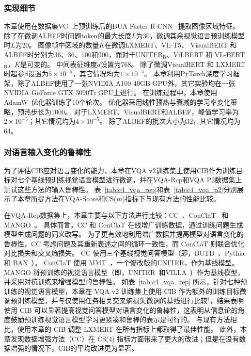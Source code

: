 \subsubsection{实现细节}
本章使用在数据集VG~\cite{krishna2017visual}上预训练后的BUA Faster R-CNN~\cite{anderson2018bottom} 提取图像区域特征。
除了在微调ALBEF时问题token的最大长度$L$为30，微调其余视觉语言预训练模型时$L$为20。
图像帧中区域的数量$K$在微调LXMERT、VL-T5、 VisualBERT 和 ALBEF时分别为36、36、100和900，而对于UNITER$_{\text{B}}$、ViLBERT 和 VL-BERT$_{\text{B}}$，$K$是可变的。
中间表征维度$d$设置为768。
除了微调VisualBERT 和 LXMERT时超参$\beta$设置为$5\times10^{-5}$，其它情况均为$1\times10^{-4}$。
本章利用PyTorch深度学习框架，除了ALBEF使用了一张NVIDIA A100 40GB GPU外，其它实验均在一张NVIDIA GeForce GTX 3090Ti GPU上进行。
在训练过程中，本章使用AdamW~\cite{loshchilov2017decoupled}优化器训练了10个轮次。
优化器采用线性预热与衰减的学习率变化策略，预热步长为1000。
对于LXMERT、VisualBERT和ALBEF，峰值学习率为$2\times 10^{-5}$；其它情况均为$4\times 10^{-5}$。
除了ALBEF的批次大小为32，其它情况均为64。







\subsubsection{对语言输入变化的鲁棒性}
为了评估CIB应对语言变化的能力，本章在VQA v2训练集上使用CIB作为训练目标对七个基线预训练视觉语言模型进行微调，并在VQA-Rep和VQA P2数据集上测试这些方法的输入鲁棒性。
表~\ref{tab:c4_vqa_rep}和表~\ref{tab:c4_vqa_p2}分别展示了本章所提方法在VQA-Score和CS($m$)指标下与现有方法的性能比较。

在VQA-Rep数据集上，本章主要与以下方法进行比较：CC~\cite{shah2019cycle}、ConClaT~\cite{kant2021contrast} 和 MANGO~\cite{li2020closer}。
具体而言，CC 和 ConClaT 在线增广训练数据，通过训练问题生成模型生成问题的同义改写。
为了更有效地利用增广数据并提高模型对语言变化的鲁棒性，CC 考虑问题及其重新表述之间的循环一致性，而 ConClaT 则联合优化对比损失和交叉熵损失。
CC 使用三个基线视觉问答模型（即，BUTD~\cite{anderson2018bottom}、Pythia~\cite{jiang2018pythia} 和 BAN~\cite{kim2018bilinear}）。
ConClaT 使用 MMT~\cite{kant2021contrast}，一个修改版的UNITER，作为基线模型。
MANGO 将预训练的视觉语言模型（即，UNITER~\cite{chen2020uniter}和VILLA~\cite{gan2020large}）作为基线模型，并采用对抗训练来增强模型的鲁棒性。
如表~\ref{tab:c4_vqa_rep} 所示，针对七种预训练的视觉语言模型，本章在 VQA v2 训练集上使用 CIB 作为额外的训练目标微调预训练模型，并与仅使用任务相关交叉熵损失微调的基线进行比较\textcolor{red}{$^\dagger$}，结果表明使用 CIB 可以显著提高视觉问答模型对语言变化的鲁棒性，这表明从信息论的角度鼓励预训练视觉语言模型学习更紧凑和鲁棒的表示是可行的。
与现有方法相比，使用本章的 CIB 调整 LXMERT 在所有指标上都取得了最佳性能。
此外，本章发现数据增强方法（CC）在 CS(4) 指标方面带来了更大的改进；但是在没有数据增强的情况下，CIB的平均改进更为显著。

